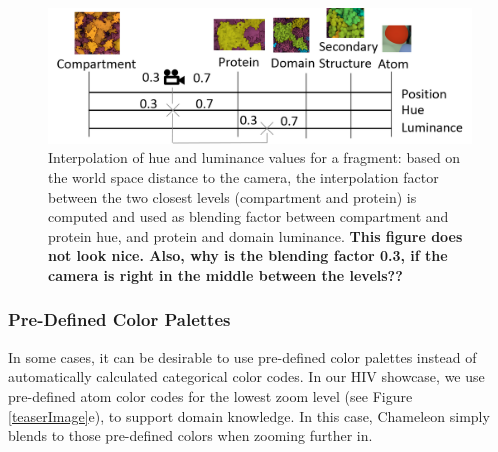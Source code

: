 \documentclass{egpubl}
\begin{document}
		\begin{figure}
			\centering
			\includegraphics[width=1\linewidth]{Figures/zoomfigure}
			\caption{Interpolation of hue and luminance values for a fragment: based on the world space distance to the camera, the interpolation factor between the two closest levels (compartment and protein) is computed and used as blending factor between compartment and protein hue, and protein and domain luminance. \textbf{This figure does not look nice. Also, why is the blending factor 0.3, if the camera is right in the middle between the levels??}  }
			\label{fig:zoom_continuum}
		\end{figure}
	
	
	\subsubsection{Pre-Defined Color Palettes}
	
	In some cases, it can be desirable to use pre-defined color palettes instead of automatically calculated categorical color codes. 
	In our HIV showcase, we use pre-defined atom color codes for the lowest zoom level (see Figure \ref{teaserImage}e), to support domain knowledge. 
	In this case, Chameleon simply blends to those pre-defined colors when zooming further in. 
	
\end{document}
